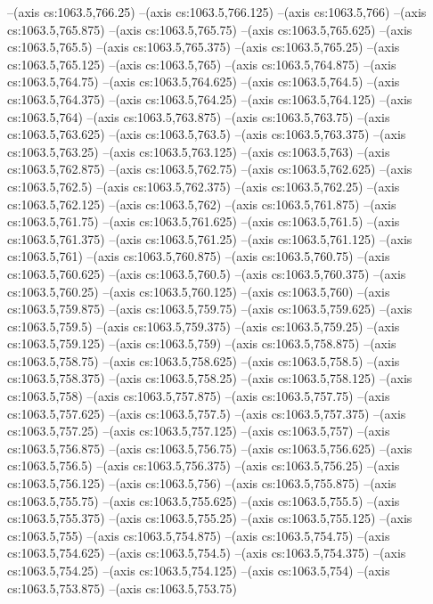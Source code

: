 --(axis cs:1063.5,766.25)
--(axis cs:1063.5,766.125)
--(axis cs:1063.5,766)
--(axis cs:1063.5,765.875)
--(axis cs:1063.5,765.75)
--(axis cs:1063.5,765.625)
--(axis cs:1063.5,765.5)
--(axis cs:1063.5,765.375)
--(axis cs:1063.5,765.25)
--(axis cs:1063.5,765.125)
--(axis cs:1063.5,765)
--(axis cs:1063.5,764.875)
--(axis cs:1063.5,764.75)
--(axis cs:1063.5,764.625)
--(axis cs:1063.5,764.5)
--(axis cs:1063.5,764.375)
--(axis cs:1063.5,764.25)
--(axis cs:1063.5,764.125)
--(axis cs:1063.5,764)
--(axis cs:1063.5,763.875)
--(axis cs:1063.5,763.75)
--(axis cs:1063.5,763.625)
--(axis cs:1063.5,763.5)
--(axis cs:1063.5,763.375)
--(axis cs:1063.5,763.25)
--(axis cs:1063.5,763.125)
--(axis cs:1063.5,763)
--(axis cs:1063.5,762.875)
--(axis cs:1063.5,762.75)
--(axis cs:1063.5,762.625)
--(axis cs:1063.5,762.5)
--(axis cs:1063.5,762.375)
--(axis cs:1063.5,762.25)
--(axis cs:1063.5,762.125)
--(axis cs:1063.5,762)
--(axis cs:1063.5,761.875)
--(axis cs:1063.5,761.75)
--(axis cs:1063.5,761.625)
--(axis cs:1063.5,761.5)
--(axis cs:1063.5,761.375)
--(axis cs:1063.5,761.25)
--(axis cs:1063.5,761.125)
--(axis cs:1063.5,761)
--(axis cs:1063.5,760.875)
--(axis cs:1063.5,760.75)
--(axis cs:1063.5,760.625)
--(axis cs:1063.5,760.5)
--(axis cs:1063.5,760.375)
--(axis cs:1063.5,760.25)
--(axis cs:1063.5,760.125)
--(axis cs:1063.5,760)
--(axis cs:1063.5,759.875)
--(axis cs:1063.5,759.75)
--(axis cs:1063.5,759.625)
--(axis cs:1063.5,759.5)
--(axis cs:1063.5,759.375)
--(axis cs:1063.5,759.25)
--(axis cs:1063.5,759.125)
--(axis cs:1063.5,759)
--(axis cs:1063.5,758.875)
--(axis cs:1063.5,758.75)
--(axis cs:1063.5,758.625)
--(axis cs:1063.5,758.5)
--(axis cs:1063.5,758.375)
--(axis cs:1063.5,758.25)
--(axis cs:1063.5,758.125)
--(axis cs:1063.5,758)
--(axis cs:1063.5,757.875)
--(axis cs:1063.5,757.75)
--(axis cs:1063.5,757.625)
--(axis cs:1063.5,757.5)
--(axis cs:1063.5,757.375)
--(axis cs:1063.5,757.25)
--(axis cs:1063.5,757.125)
--(axis cs:1063.5,757)
--(axis cs:1063.5,756.875)
--(axis cs:1063.5,756.75)
--(axis cs:1063.5,756.625)
--(axis cs:1063.5,756.5)
--(axis cs:1063.5,756.375)
--(axis cs:1063.5,756.25)
--(axis cs:1063.5,756.125)
--(axis cs:1063.5,756)
--(axis cs:1063.5,755.875)
--(axis cs:1063.5,755.75)
--(axis cs:1063.5,755.625)
--(axis cs:1063.5,755.5)
--(axis cs:1063.5,755.375)
--(axis cs:1063.5,755.25)
--(axis cs:1063.5,755.125)
--(axis cs:1063.5,755)
--(axis cs:1063.5,754.875)
--(axis cs:1063.5,754.75)
--(axis cs:1063.5,754.625)
--(axis cs:1063.5,754.5)
--(axis cs:1063.5,754.375)
--(axis cs:1063.5,754.25)
--(axis cs:1063.5,754.125)
--(axis cs:1063.5,754)
--(axis cs:1063.5,753.875)
--(axis cs:1063.5,753.75)
